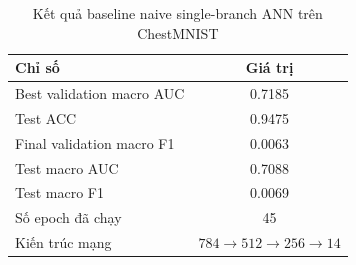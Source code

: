 \begin{table}[H]
\centering
\caption{Kết quả baseline naive single-branch ANN trên ChestMNIST}
\label{tab:chestmnist-naive-results}
\begin{tabular}{l c}
\toprule
Chỉ số & Giá trị \\
\midrule
Best validation macro AUC & 0.7185 \\
Test ACC & 0.9475 \\
Final validation macro F1 & 0.0063 \\
Test macro AUC & 0.7088 \\
Test macro F1 & 0.0069 \\
Số epoch đã chạy & 45 \\
Kiến trúc mạng & $784 \rightarrow 512 \rightarrow 256 \rightarrow 14$ \\
\bottomrule
\end{tabular}
\end{table}
